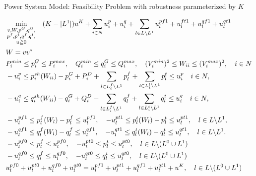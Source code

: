 \documentclass[xcolor=dvipsnames]{beamer}
\newcommand{\p}[1]{p^{#1}}
\newcommand{\q}[1]{q^{#1}}
\newcommand{\ii}{i}
\newcommand{\llll}{l}
\newcommand{\from}{f}
\newcommand{\tto}{t}
\newcommand{\WW}{W}
\newcommand{\Lines}{L}
\begin{document}
\begin{frame}{Power System Model: Feasibility Problem with robustness parameterized by $K$}
\begin{footnotesize}
\begin{subequations}
\begin{align}
&\min_{\substack{v,W,p^G,q^G,\\ p^f,p^t,q^f,q^t,\\ u \geqq 0}} \quad 
  (K-|L^1|) u^K + \sum_{i \in N} u_i^p + u_i^q + \sum_{l \in L \backslash L^1} u_l^{pf1} + u_l^{ft1} + u_l^{qf1} + u_l^{qt1}  \notag \\
  & W = v v^* \notag\\
  & P_i^{min} \leq p_i^G \leq P_i^{max}, \quad Q_i^{min} \leq q_i^G \leq Q_i^{max}, \quad (V_i^{min})^2 \leq W_{ii} \leq (V_i^{max})^2,\quad i\in N \notag \\
  & -u_i^p \le p_i^{sh}(\WW_{ii}) - p^G_i + P^D_i 
	+ \sum_{\llll \in \Lines_\ii^{\from} \backslash L^1  } p_{l}^{f}  
	+\sum_{\llll \in \Lines_\ii^{\tto} \backslash L^1   } p_{l}^{t} 
	\le u_i^p \quad i\in N, \notag\\ 
  & -u_i^q \le q_i^{sh}(\WW_{ii}) - q^G_i + Q^D_i 
	+ \sum_{\llll \in \Lines_\ii^{\from} \backslash L^1 } q_{l}^{f}
	+ \sum_{\llll \in \Lines_\ii^{\tto} \backslash L^1 } q_{l}^{t} 
	\le u_i^q \quad i\in N, \notag \\
& -u_l^{pf1} \le \p{\from}_{\llll}(\WW_\llll) - p_{l}^{f} \le u_l^{pf1}, \quad
 -u_l^{pt1} \le \p{\tto}_{\llll}(\WW_\llll)  - p_{l}^{t} \le u_l^{pt1}, \quad \llll \in L \backslash L^1, \notag \\
& -u_l^{qf1} \le \q{\from}_{\llll}(\WW_\llll) - q_{l}^{f} \le u_l^{qf1}, \quad 
 -u_l^{qt1} \le \q{\tto}_{\llll}(\WW_\llll)  - q_{l}^{t} \le u_l^{qt1}, \quad \llll \in L \backslash L^1. \notag \\
& -u_l^{pf0} \le p_l^f \le u_l^{pf0},\quad-u_l^{pt0} \le p_l^t \le u_l^{pt0}, \quad l \in L \backslash (L^0 \cup L^1) \notag\\ 
& -u_l^{qf0} \le q_l^f \le u_l^{qf0},\quad-u_l^{qt0} \le q_l^t \le u_l^{qt0}, \quad l \in L \backslash (L^0 \cup L^1) \notag \\
& u_l^{pf0} + u_l^{pt0} + u_l^{qf0} + u_l^{qt0} = u_l^{pf1} + u_l^{pt1} + u_l^{qf1} + u_l^{qt1} + u^K,\quad l \in L \backslash (L^0 \cup L^1) \notag
\end{align}
\end{subequations}
\end{footnotesize}
\end{frame}
\end{document}
